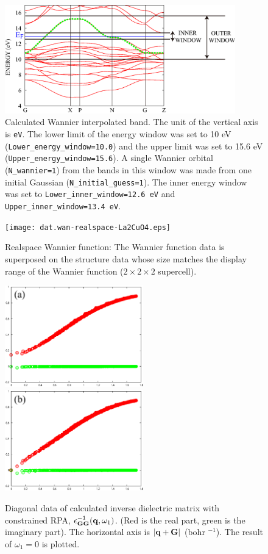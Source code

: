\documentclass{article}
\begin{document}
\begin{figure}[h] 
\centering
\includegraphics[width=10cm]{dat.iband.La2CuO4.eps}
\caption{Calculated Wannier interpolated band. The unit of the vertical axis is {\tt eV}. The lower limit of the energy window was set to 10 eV ({\tt Lower\_energy\_window=10.0}) and the upper limit was set to 15.6 eV ({\tt Upper\_energy\_window=15.6}). A single Wannier orbital ({\tt N\_wannier=1}) from the bands in this window was made from one initial Gaussian ({\tt N\_initial\_guess=1}). The inner energy window was set to {\tt Lower\_inner\_window=12.6 eV} and {\tt Upper\_inner\_window=13.4 eV}.}
\label{band-La2CuO4}
\end{figure}
\begin{figure}[H] 
\centering
\texttt{[image: dat.wan-realspace-La2CuO4.eps]}
\caption{Realspace Wannier function: The Wannier function data is superposed on the structure data whose size matches the display range of the Wannier function ($2\times2\times2$ supercell).} 
\label{vesta-La2CuO4}
\end{figure}
\begin{figure}[H] 
\centering
\includegraphics[width=6cm]{epsq0-cRPA-La2CuO4.eps}
\includegraphics[width=6cm]{epsq0-fRPA-La2CuO4.eps}
\caption{Diagonal data of calculated inverse dielectric matrix with constrained RPA, $\epsilon_{{\bf GG}}^{-1} ({\bf q}, \omega_1)$. (Red is the real part, green is the imaginary part). The horizontal axis is $|{\bf q+G}|$ (bohr $^{- 1}$). The result of $\omega_1=0$ is plotted.}
\label{epsqw-cRPA-La2CuO4}
\end{figure}
\end{document}
